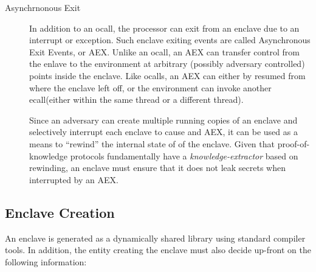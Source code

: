 \documentclass[11pt]{article}
\newcommand{\ecall}{\textsf{ecall}}
\newcommand{\ocall}{\textsf{ocall}}
\begin{document}
\begin{description}
  \item[Asynchrnonous Exit] In addition to an \ocall, the
    processor can exit from an enclave due to an interrupt or
    exception. Such enclave exiting events are called Asynchronous
    Exit Events, or AEX. Unlike an \ocall, an AEX can transfer control
    from the enlave to the environment at arbitrary (possibly adversary
    controlled) points inside the enclave. Like \ocall s, an AEX can
    either by resumed from where the enclave left off, or the
    environment can invoke another \ecall (either within the same
    thread or a different thread).

    Since an adversary can create multiple running copies of an
    enclave and selectively interrupt each enclave to cause and AEX,
    it can be used as a means to ``rewind'' the internal state of of
    the enclave. Given that proof-of-knowledge \cite{BellarePOK}
    protocols fundamentally have a \textit{knowledge-extractor} based
    on rewinding, an enclave must ensure that it does not leak secrets
    when interrupted by an AEX.

  \end{description}

  \subsection{Enclave Creation}
  \label{sec:enclavecreateion}
  An enclave is generated as a dynamically shared library using
  standard compiler tools. In addition, the entity creating the
  enclave must also decide up-front on the following information:
\end{document}
